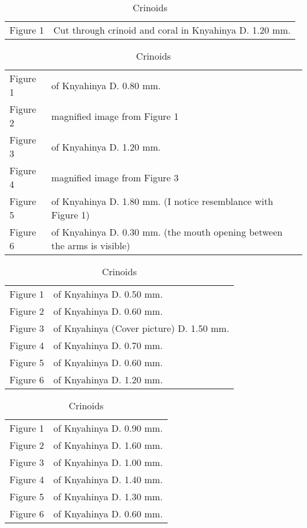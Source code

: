 \documentclass[a4paper, 12pt, oneside]{article}
\begin{document}
\begin{table}[ht!]
\caption{Crinoids}
\centering
\begin{tabular}{ p{2cm} p{10cm} }
\hline
 Figure 1 & Cut through crinoid and coral in Knyahinya D. 1.20 mm.
\end{tabular}
\label{table:20}
\end{table}
\begin{table}[ht!]
\caption{Crinoids}
\centering
\begin{tabular}{ p{2cm} p{10cm} }
\hline
 Figure 1 & of Knyahinya D. 0.80 mm. \\
 Figure 2 & magnified image from Figure 1 \\
 Figure 3 & of Knyahinya D. 1.20 mm. \\
 Figure 4 & magnified image from Figure 3 \\
 Figure 5 & of Knyahinya D. 1.80 mm. (I notice resemblance with Figure 1) \\
 Figure 6 & of Knyahinya D. 0.30 mm. (the mouth opening between the arms is visible)
\end{tabular}
\label{table:21}
\end{table}
\begin{table}[ht!]
\caption{Crinoids}
\centering
\begin{tabular}{ p{2cm} p{10cm} }
\hline
 Figure 1 & of Knyahinya D. 0.50 mm. \\
 Figure 2 & of Knyahinya D. 0.60 mm. \\
 Figure 3 & of Knyahinya (Cover picture) D. 1.50 mm. \\
 Figure 4 & of Knyahinya D. 0.70 mm. \\
 Figure 5 & of Knyahinya D. 0.60 mm. \\
 Figure 6 & of Knyahinya D. 1.20 mm.
\end{tabular}
\label{table:22}
\end{table}
\begin{table}[ht!]
\caption{Crinoids}
\centering
\begin{tabular}{ p{2cm} p{10cm} }
\hline
 Figure 1 & of Knyahinya D. 0.90 mm. \\
 Figure 2 & of Knyahinya D. 1.60 mm. \\
 Figure 3 & of Knyahinya D. 1.00 mm. \\
 Figure 4 & of Knyahinya D. 1.40 mm. \\
 Figure 5 & of Knyahinya D. 1.30 mm. \\
 Figure 6 & of Knyahinya D. 0.60 mm.
\end{tabular}
\label{table:23}
\end{table}
\end{document}
